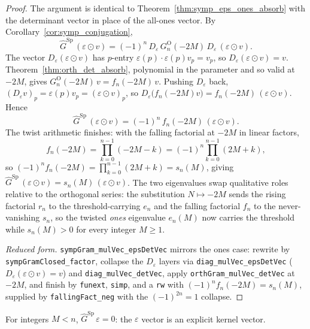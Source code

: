 \begin{proof}
\leanok
{}
The argument is identical to Theorem~\ref{thm:symp_eps_ones_absorb} with the
determinant vector in place of the all-ones vector. By
Corollary~\ref{cor:symp_conjugation},
\[
  \widehat G^{\mathrm{Sp}}\,(\varepsilon\odot v)
   =(-1)^n\,D_\varepsilon\,G^{\mathrm O}_n(-2M)\,D_\varepsilon\,(\varepsilon\odot v).
\]
The vector $D_\varepsilon(\varepsilon\odot v)$ has $p$-entry
$\varepsilon(p)\cdot\varepsilon(p)v_p=v_p$, so $D_\varepsilon(\varepsilon\odot v)=v$.
Theorem~\ref{thm:orth_det_absorb}, polynomial in the parameter and so valid
at $-2M$, gives $G^{\mathrm O}_n(-2M)\,v=f_n(-2M)\,v$. Pushing $D_\varepsilon$
back, $(D_\varepsilon v)_p=\varepsilon(p)v_p=(\varepsilon\odot v)_p$, so
$D_\varepsilon\bigl(f_n(-2M)v\bigr)=f_n(-2M)\,(\varepsilon\odot v)$. Hence
\[
  \widehat G^{\mathrm{Sp}}\,(\varepsilon\odot v)=(-1)^n\,f_n(-2M)\,(\varepsilon\odot v).
\]
The twist arithmetic finishes: with the falling factorial at $-2M$ in linear
factors,
\[
  f_n(-2M)=\prod_{k=0}^{n-1}(-2M-k)=(-1)^n\prod_{k=0}^{n-1}(2M+k),
\]
so $(-1)^n f_n(-2M)=\prod_{k=0}^{n-1}(2M+k)=s_n(M)$, giving
$\widehat G^{\mathrm{Sp}}\,(\varepsilon\odot v)=s_n(M)\,(\varepsilon\odot v)$.
The two eigenvalues swap qualitative roles relative to the orthogonal series:
the substitution $N\mapsto-2M$ sends the rising factorial $r_n$ to the
threshold-carrying $e_n$ and the falling factorial $f_n$ to the
never-vanishing $s_n$, so the twisted \emph{ones} eigenvalue $e_n(M)$ now
carries the threshold while $s_n(M)>0$ for every integer $M\ge 1$.

\medskip
\noindent\emph{Reduced form.} \texttt{sympGram\_mulVec\_epsDetVec} mirrors the
ones case: rewrite by \texttt{sympGramClosed\_factor}, collapse the
$D_\varepsilon$ layers via \texttt{diag\_mulVec\_epsDetVec}
($D_\varepsilon(\varepsilon\odot v)=v$) and \texttt{diag\_mulVec\_detVec}, apply
\texttt{orthGram\_mulVec\_detVec} at $-2M$, and finish by \texttt{funext},
\texttt{simp}, and a \texttt{rw} with $(-1)^n f_n(-2M)=s_n(M)$, supplied by \texttt{fallingFact\_neg} with the
$(-1)^{2n}=1$ collapse.
\end{proof}

\begin{theorem}\label{thm:symp_ker_witness}
\leanok
{}
For integers $M<n$, $\widehat G^{\mathrm{Sp}}\,\varepsilon = 0$: the
$\varepsilon$ vector is an explicit kernel vector.
\end{theorem}

